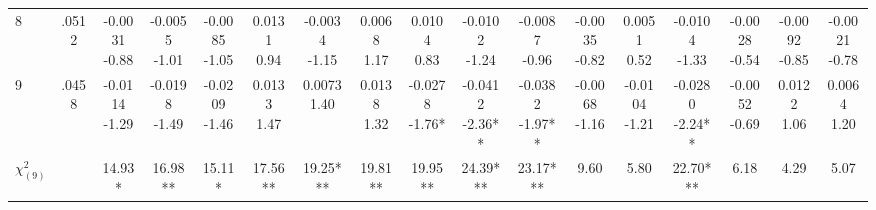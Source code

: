 \begin{landscape}
\begin{center}
{\begin{adjustbox}{max width=\textheight}
\begin{tabular}{lcccccccccccccccc}
8 & .0512 & \shortstack{-0.0031\\-0.88} & \shortstack{-0.0055\\-1.01} & \shortstack{-0.0085\\-1.05} & \shortstack{0.0131\\0.94} & \shortstack{-0.0034\\-1.15} & \shortstack{0.0068\\1.17} & \shortstack{0.0104\\0.83} & \shortstack{-0.0102\\-1.24} & \shortstack{-0.0087\\-0.96} & \shortstack{-0.0035\\-0.82} & \shortstack{0.0051\\0.52} & \shortstack{-0.0104\\-1.33} & \shortstack{-0.0028\\-0.54} & \shortstack{-0.0092\\-0.85} & \shortstack{-0.0021\\-0.78} \\
9 & .0458 & \shortstack{-0.0114\\-1.29} & \shortstack{-0.0198\\-1.49} & \shortstack{-0.0209\\-1.46} & \shortstack{0.0133\\1.47} & \shortstack{0.0073\\1.40} & \shortstack{0.0138\\1.32} & \shortstack{-0.0278\\-1.76*} & \shortstack{-0.0412\\-2.36**} & \shortstack{-0.0382\\-1.97**} & \shortstack{-0.0068\\-1.16} & \shortstack{-0.0104\\-1.21} & \shortstack{-0.0280\\-2.24**} & \shortstack{-0.0052\\-0.69} & \shortstack{0.0122\\1.06} & \shortstack{0.0064\\1.20} \\
$\chi^2_{(9)}$ &  & 14.93* & 16.98** & 15.11* & 17.56** & 19.25*** & 19.81** & 19.95** & 24.39*** & 23.17*** & 9.60 & 5.80 & 22.70*** & 6.18 & 4.29 & 5.07 \\
\bottomrule
\end{tabular}
\end{adjustbox}}
\end{center}
\end{landscape}


